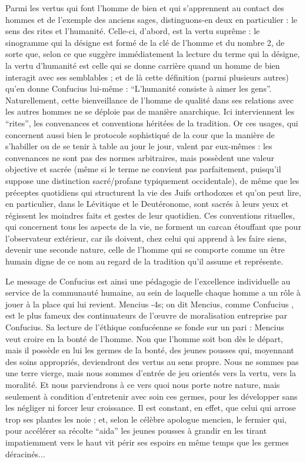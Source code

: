 \documentclass[11pt,a4paper]{article} %
\begin{document}
Parmi les vertus qui font l'homme de bien et qui s'apprennent au contact des hommes et
de l'exemple des anciens sages, distinguons-en deux en particulier : le sens des rites et
l'humanité.
Celle-ci, d'abord, est la vertu suprême : le sinogramme qui la désigne
est formé de la clé de l'homme et du nombre 2, de sorte que,
selon ce que suggère immédiatement la lecture du terme qui la désigne, la vertu
d'humanité est celle qui se donne carrière quand un homme de bien interagit avec ses
semblables ; et de là cette définition (parmi plusieurs autres) qu'en donne Confucius lui-même :
``L'humanité consiste à aimer les gens''.
Naturellement, cette bienveillance
de l'homme de qualité dans ses relations avec les autres hommes ne se déploie
pas de manière anarchique.
Ici interviennent les ``rites'', les convenances et conventions
héritées de la tradition.
Or ces usages, qui concernent aussi bien le protocole
sophistiqué de la cour que la manière de s'habiller ou de se tenir à table au jour le jour,
valent par eux-mêmes : les convenances ne sont pas des normes arbitraires, mais possèdent
une valeur objective et sacrée (même si le terme ne convient pas parfaitement,
puisqu'il suppose une distinction sacré/profane typiquement occidentale), de même que
les préceptes quotidiens qui structurent la vie des Juifs orthodoxes et qu'on peut lire, en
particulier, dans le Lévitique et le Deutéronome, sont sacrés à leurs yeux et régissent les
moindres faits et gestes de leur quotidien.
Ces conventions rituelles, qui concernent tous
les aspects de la vie, ne forment un carcan étouffant que pour l'observateur extérieur, car
ils doivent, chez celui qui apprend à les faire siens, devenir une seconde nature, celle de
l'homme qui se comporte comme un être humain digne de ce nom au regard de la tradition qu'il assume et représente.

Le message de Confucius est ainsi une pédagogie de l'excellence individuelle au service
de la communauté humaine, au sein de laquelle chaque homme a un rôle à jouer à la place
qui lui revient.
Mencius -4s; on dit Mencius, comme Confucius
, est le plus fameux des continuateurs de l'œuvre de moralisation entreprise par
Confucius.
Sa lecture de l'éthique confucéenne se fonde sur un pari :
Mencius veut croire en la bonté de l'homme.
Non que l'homme soit bon dès le départ, mais il possède en lui
les germes de la bonté, des jeunes pousses qui, moyennant des
soins appropriés, deviendront des vertus au sens propre.
Nous ne sommes pas une terre
vierge, mais nous sommes d'entrée de jeu orientés vers la vertu, vers la moralité.
Et nous
parviendrons à ce vers quoi nous porte notre nature, mais seulement à condition
d'entretenir avec soin ces germes, pour les développer sans les négliger ni forcer leur
croissance.
Il est constant, en effet, que celui qui arrose trop ses plantes les noie ; et, selon
le célèbre apologue mencien, le fermier qui, pour accélérer sa récolte ``aida'' les jeunes
pousses à grandir en les tirant impatiemment vers le haut vit périr ses espoirs en même
temps que les germes déracinés...
\end{document}
